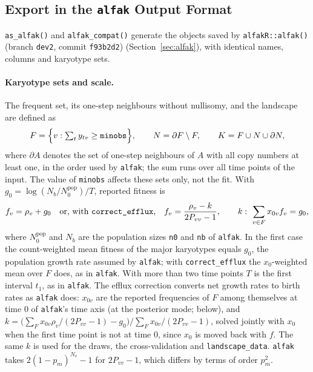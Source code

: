 \documentclass[11pt]{article}
\begin{document}
\subsection{Export in the \texttt{alfak} Output Format}
\label{sec:sj-alfak}

\texttt{as\_alfak()} and \texttt{alfak\_compat()} generate the objects saved
by \texttt{alfakR::alfak()} (branch \texttt{dev2}, commit \texttt{f93b2d2}) (Section~\ref{sec:alfak}), with identical names,
columns and karyotype sets.

\paragraph{Karyotype sets and scale.}
The frequent set, its one-step neighbours without nullisomy, and the
landscape are defined as
\begin{equation}
  F=\Bigl\{v:\textstyle\sum_t y_{tv}\ge\texttt{minobs}\Bigr\},\qquad
  N=\partial F\setminus F,\qquad
  K=F\cup N\cup\partial N,
  \label{eq:alfak-sets}
\end{equation}
where $\partial A$ denotes the set of one-step neighbours of $A$ with all copy
numbers at least one, in the order used by \texttt{alfak}; the sum runs over
all time points of the input. The value of
\texttt{minobs} affects these sets only, not the fit. With
$g_0=\log(N_b/N_0^{\mathrm{pop}})/T$, reported fitness is
\begin{equation}
  f_v=\rho_v+g_0
  \quad\text{or, with \texttt{correct\_efflux},}\quad
  f_v=\frac{\rho_v-k}{2P_{vv}-1},\qquad
  k:\ \sum_{v\in F}x_{0v}f_v=g_0,
  \label{eq:alfak-scale}
\end{equation}
where $N_0^{\mathrm{pop}}$ and $N_b$ are the population sizes \texttt{n0} and
\texttt{nb} of \texttt{alfak}. In the first case the count-weighted mean
fitness of the major karyotypes equals $g_0$, the population growth rate
assumed by \texttt{alfak}; with \texttt{correct\_efflux} the $x_0$-weighted
mean over $F$ does, as in \texttt{alfak}. With
more than two time points $T$ is the first interval $t_1$, as in \texttt{alfak}.
The efflux correction converts net growth rates to birth rates as
\texttt{alfak} does: $x_{0v}$ are the reported frequencies of $F$ among
themselves at time 0 of \texttt{alfak}'s time axis (at the posterior mode;
below), and $k=\bigl(\sum_Fx_{0v}\rho_v/(2P_{vv}-1)-g_0\bigr)/\sum_Fx_{0v}/(2P_{vv}-1)$,
solved jointly with $x_0$ when the first time point is not at time 0, since
$x_0$ is moved back with $f$. The same $k$ is used for the draws, the
cross-validation and \texttt{landscape\_data}. \texttt{alfak} takes
$2(1-p_m)^{N_v}-1$ for $2P_{vv}-1$, which differs by terms of order $p_m^2$.
\end{document}
